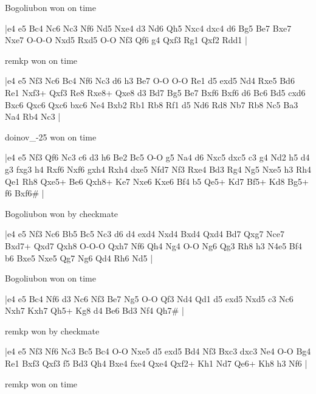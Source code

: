 Bogoliubon won on time

\makegametitle
|e4 e5 Bc4 Nc6 Nc3 Nf6 Nd5 Nxe4 d3 Nd6 Qh5 Nxc4 dxc4 d6 Bg5 Be7 Bxe7 Nxe7 O-O-O Nxd5 Rxd5 O-O Nf3 Qf6 g4 Qxf3 Rg1 Qxf2 Rdd1  |

\showboard

remkp won on time

\makegametitle
|e4 e5 Nf3 Nc6 Bc4 Nf6 Nc3 d6 h3 Be7 O-O O-O Re1 d5 exd5 Nd4 Rxe5 Bd6 Re1 Nxf3+ Qxf3 Re8 Rxe8+ Qxe8 d3 Bd7 Bg5 Be7 Bxf6 Bxf6 d6 Bc6 Bd5 cxd6 Bxc6 Qxc6 Qxc6 bxc6 Ne4 Bxb2 Rb1 Rb8 Rf1 d5 Nd6 Rd8 Nb7 Rb8 Nc5 Ba3 Na4 Rb4 Nc3  |

\showboard

doinov\_-25 won on time

\makegametitle
|e4 e5 Nf3 Qf6 Nc3 c6 d3 h6 Be2 Bc5 O-O g5 Na4 d6 Nxc5 dxc5 c3 g4 Nd2 h5 d4 g3 fxg3 h4 Rxf6 Nxf6 gxh4 Rxh4 dxe5 Nfd7 Nf3 Rxe4 Bd3 Rg4 Ng5 Nxe5 h3 Rh4 Qe1 Rh8 Qxe5+ Be6 Qxh8+ Ke7 Nxe6 Kxe6 Bf4 b5 Qe5+ Kd7 Bf5+ Kd8 Bg5+ f6 Bxf6\#  |

\showboard

Bogoliubon won by checkmate

\makegametitle
|e4 e5 Nf3 Nc6 Bb5 Bc5 Nc3 d6 d4 exd4 Nxd4 Bxd4 Qxd4 Bd7 Qxg7 Nce7 Bxd7+ Qxd7 Qxh8 O-O-O Qxh7 Nf6 Qh4 Ng4 O-O Ng6 Qg3 Rh8 h3 N4e5 Bf4 b6 Bxe5 Nxe5 Qg7 Ng6 Qd4 Rh6 Nd5  |

\showboard

Bogoliubon won on time

\makegametitle
|e4 e5 Bc4 Nf6 d3 Nc6 Nf3 Be7 Ng5 O-O Qf3 Nd4 Qd1 d5 exd5 Nxd5 c3 Nc6 Nxh7 Kxh7 Qh5+ Kg8 d4 Be6 Bd3 Nf4 Qh7\#  |

\showboard

remkp won by checkmate

\makegametitle
|e4 e5 Nf3 Nf6 Nc3 Bc5 Bc4 O-O Nxe5 d5 exd5 Bd4 Nf3 Bxc3 dxc3 Ne4 O-O Bg4 Re1 Bxf3 Qxf3 f5 Bd3 Qh4 Bxe4 fxe4 Qxe4 Qxf2+ Kh1 Nd7 Qe6+ Kh8 h3 Nf6  |

\showboard

remkp won on time

